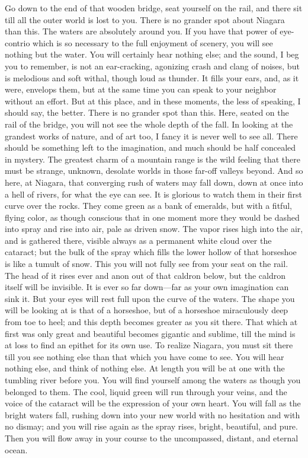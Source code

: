 Go down to the end of that wooden bridge, seat yourself on the
rail, and there sit till all the outer world is lost to you.  There
is no grander spot about Niagara than this.  The waters are
absolutely around you.  If you have that power of eye-contrio which
is so necessary to the full enjoyment of scenery, you will see
nothing but the water.  You will certainly hear nothing else; and
the sound, I beg you to remember, is not an ear-cracking, agonizing
crash and clang of noises, but is melodious and soft withal, though
loud as thunder.  It fills your ears, and, as it were, envelops
them, but at the same time you can speak to your neighbor without
an effort.  But at this place, and in these moments, the less of
speaking, I should say, the better.  There is no grander spot than
this.  Here, seated on the rail of the bridge, you will not see the
whole depth of the fall.  In looking at the grandest works of
nature, and of art too, I fancy it is never well to see all.  There
should be something left to the imagination, and much should be
half concealed in mystery.  The greatest charm of a mountain range
is the wild feeling that there must be strange, unknown, desolate
worlds in those far-off valleys beyond.  And so here, at Niagara,
that converging rush of waters may fall down, down at once into a
hell of rivers, for what the eye can see.  It is glorious to watch
them in their first curve over the rocks.  They come green as a
bank of emeralds, but with a fitful, flying color, as though
conscious that in one moment more they would be dashed into spray
and rise into air, pale as driven snow.  The vapor rises high into
the air, and is gathered there, visible always as a permanent white
cloud over the cataract; but the bulk of the spray which fills the
lower hollow of that horseshoe is like a tumult of snow.  This you
will not fully see from your seat on the rail.  The head of it
rises ever and anon out of that caldron below, but the caldron
itself will be invisible.  It is ever so far down---far as your own
imagination can sink it.  But your eyes will rest full upon the
curve of the waters.  The shape you will be looking at is that of a
horseshoe, but of a horseshoe miraculously deep from toe to heel;
and this depth becomes greater as you sit there.  That which at
first was only great and beautiful becomes gigantic and sublime,
till the mind is at loss to find an epithet for its own use.  To
realize Niagara, you must sit there till you see nothing else than
that which you have come to see.  You will hear nothing else, and
think of nothing else.  At length you will be at one with the
tumbling river before you.  You will find yourself among the waters
as though you belonged to them.  The cool, liquid green will run
through your veins, and the voice of the cataract will be the
expression of your own heart.  You will fall as the bright waters
fall, rushing down into your new world with no hesitation and with
no dismay; and you will rise again as the spray rises, bright,
beautiful, and pure.  Then you will flow away in your course to the
uncompassed, distant, and eternal ocean.

